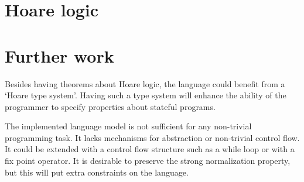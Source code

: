 \documentclass{article}
\begin{document}
\section{Hoare logic}


\section{Further work}\label{sec:further}

Besides having theorems about Hoare logic, the language could benefit from a `Hoare type system'. Having such a type system will enhance the ability of the programmer to specify properties about stateful programs.

The implemented language model is not sufficient for any non-trivial programming task. It lacks mechanisms for abstraction or non-trivial control flow. It could be extended with a control flow structure such as a while loop or with a fix point operator. It is desirable to preserve the strong normalization property, but this will put extra constraints on the language.
\end{document}
